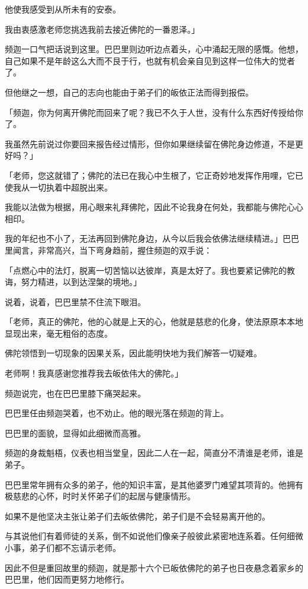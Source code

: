 \documentclass[twoside,openany]{book}
\begin{document}
他使我感受到从所未有的安泰。

我由衷感激老师您挑选我前去接近佛陀的一番恩泽。」

频迦一口气把话说到这里。巴巴里则边听边点着头，心中涌起无限的感慨。他想，自己如果不是年龄这么大而不艮于行，也就有机会亲自见到这样一位伟大的觉者了。

但他继之一想，自己的志向也能由于弟子们的皈依正法而得到报偿。

「频迦，你为何离开佛陀而回来了呢？我已不久于人世，没有什么东西好传授给你了。

我虽然先前说过你要回来报告经过情形，但你如果继续留在佛陀身边修道，不是更好吗？」

「老师，您这就错了；佛陀的法已在我心中生根了，它正奇妙地发挥作用哩，它已使我从一切执着中超脱出来。

我能以法做为根据，用心眼来礼拜佛陀，因此不论我身在何处，我都能与佛陀心心相印。

我的年纪也不小了，无法再回到佛陀身边，从今以后我会依佛法继续精进。」巴巴里闻言，非常高兴，当下弯身趋前，握住频迦的双手说：

「点燃心中的法灯，脱离一切苦恼以达彼岸，真是太好了。我也要紧记佛陀的教诲，努力精进，以到达涅槃的境地。」

说着，说着，巴巴里禁不住流下眼泪。

「老师，真正的佛陀，他的心就是上天的心，他就是慈悲的化身，使法原原本本地显现出来，毫无粗俗的态度。

佛陀领悟到一切现象的因果关系，因此能明快地为我们解答一切疑难。

老师啊！我真感谢您推荐我去皈依伟大的佛陀。」





频迦说完，也在巴巴里膝下痛哭起来。

巴巴里任由频迦哭着，也不劝止。他的眼光落在频迦的背上。

巴巴里的面貌，显得如此细微而高雅。

频迦的身裁魁梧，仪表也相当堂皇，因此二人在一起，简直分不清谁是老师，谁是弟子。

巴巴里常年拥有众多的弟子，他的知识丰富，是其他婆罗门难望其项背的。他拥有极慈悲的心怀，时时关怀弟子们的起居与健康情形。

如果不是他坚决主张让弟子们去皈依佛陀，弟子们是不会轻易离开他的。

与其说他们有着师徒的关系，倒不如说他们像亲子般彼此紧密地连系着。任何细微小事，弟子们都不忘请示老师。

因此不但是重回故里的频迦，就是那十六个已皈依佛陀的弟子也日夜悬念着家乡的巴巴里，他们因而更努力地修行。
\end{document}
